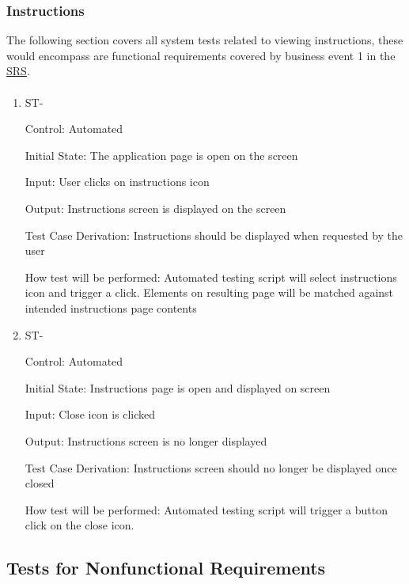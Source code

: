 \documentclass[12pt, titlepage]{article}
\newcounter{TESTID}
\newcommand\TESTNUM{\stepcounter{TESTID}\theTESTID}
\begin{document}
	\subsubsection{Instructions}
	
	The following section covers all system tests related to viewing instructions, these would encompass are functional requirements covered by business event 1 in the \href{https://github.com/RutheniumVI/UnderTree/blob/main/docs/SRS/SRS.pdf}{SRS}.
	
	\paragraph{}
	
	\begin{enumerate}
		
		\item{ST-\TESTNUM\\}
		
		Control: Automated
		
		Initial State: The application page is open on the screen
		
		Input: User clicks on instructions icon
		
		Output: Instructions screen is displayed on the screen
		
		Test Case Derivation: Instructions should be displayed when requested by the user
		
		How test will be performed: Automated testing script will select instructions icon and trigger a click. Elements on resulting page will be matched against intended instructions page contents
		
		\item{ST-\TESTNUM\\}
		
		Control: Automated
		
		Initial State: Instructions page is open and displayed on screen
		
		Input: Close icon is clicked
		
		Output: Instructions screen is no longer displayed
		
		Test Case Derivation: Instructions screen should no longer be displayed once closed
		
		How test will be performed: Automated testing script will trigger a button click on the close icon. 
		
	\end{enumerate}
	
	\subsection{Tests for Nonfunctional Requirements}
	
\end{document}
